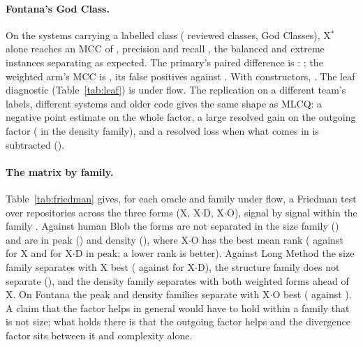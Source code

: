 \documentclass[11pt,a4paper]{article}
\newcommand{\madz}{modified $z \geq 3.5$}
\newcommand{\fitwidth}[1]{\resizebox{\ifdim\width>\textwidth\textwidth\else\width\fi}{!}{#1}}
\newcommand{\Xs}{X$^*$}
\begin{document}
\paragraph{Fontana's God Class.} On the \fontanaPopSystems{} systems
carrying a labelled class (\fontanaPopUniv{} reviewed classes,
\fontanaPopPos{} God Classes), \Xs{} alone reaches an MCC of \fontanaXMcc{}, precision
\fontanaXPrecision{} and recall \fontanaXRecall{}, the balanced and extreme
instances separating as expected. The primary's paired difference is
\fontanaMicro{}: \fontanaReading{}; the weighted arm's MCC is
\fontanaDMcc{}, its false positives \fontanaDFp{} against \fontanaXFp{}.
With constructors, \fontanaCtorMicro{}. The leaf diagnostic
(Table~\ref{tab:leaf}) is \leafFontanaReading{} under flow. The replication on a different team's
labels, different systems and older code gives the same shape as MLCQ: a
negative point estimate on the whole factor, a large resolved gain on the
outgoing factor (\cellFontanaDensityO{} in the density family), and a
resolved loss when what comes in is subtracted (\cellFontanaDensityDO{}).

\paragraph{The matrix by family.} Table~\ref{tab:friedman} gives, for each
oracle and family under flow, a Friedman test over repositories across the
three forms (X, X$\cdot$D, X$\cdot$O), signal by signal within the family
\cite{friedman1937}. Against human Blob the forms are not separated in the
size family (\friedBlobSizeP{}) and are in peak (\friedBlobPeakP{})
and density (\friedBlobDensityP{}), where X$\cdot$O has the best mean
rank (\friedBlobPeakRankO{} against \friedBlobPeakRankX{} for X and
\friedBlobPeakRankD{} for X$\cdot$D in peak; a lower rank is better).
Against Long Method the size family separates with X best
(\friedLongSizeRankX{} against \friedLongSizeRankD{} for X$\cdot$D), the
structure family does not separate (\friedLongStructureP{}), and the
density family separates with both weighted forms ahead of X. On Fontana
the peak and density families separate with X$\cdot$O best
(\friedFontanaDensityRankO{} against \friedFontanaDensityRankX{}). A claim
that the factor helps in general would have to hold within a family that is
not size; what holds there is that the outgoing factor helps and the
divergence factor sits between it and complexity alone.

\begin{table}[t]
\centering
\caption{Friedman tests over repositories across the three forms within
each family, flow definition, \madz{}: mean rank of each form (1 is best),
$n$ repositories after dropping those where every signal ties, and the
$\chi^2$ test's $p$.}
\label{tab:friedman}
\small
\setlength{\tabcolsep}{4pt}
\fitwidth{}
\end{table}
\end{document}
